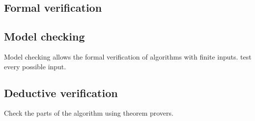 
\subsection{Formal verification}

\subsection{Model checking}
Model checking allows the formal verification of algorithms with finite inputs. test every possible input.

\subsection{Deductive verification}
Check the parts of the algorithm using theorem provers.

